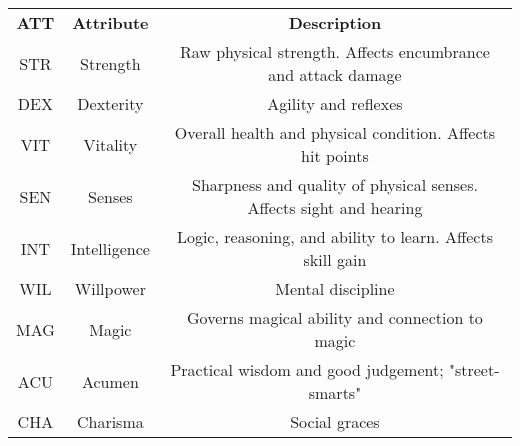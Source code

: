 
\begin{table}[h!]
    \begin{tabular}{c c c}
        \bfseries{ATT} & \bfseries{Attribute} & \bfseries{Description} \\
        STR & Strength & Raw physical strength. Affects encumbrance and attack damage \\
        DEX & Dexterity & Agility and reflexes \\
        VIT & Vitality & Overall health and physical condition. Affects hit points \\
        SEN & Senses & Sharpness and quality of physical senses. Affects sight and hearing \\
        INT & Intelligence & Logic, reasoning, and ability to learn. Affects skill gain \\
        WIL & Willpower & Mental discipline \\
        MAG & Magic & Governs magical ability and connection to magic \\
        ACU & Acumen & Practical wisdom and good judgement; "street-smarts" \\
        CHA & Charisma & Social graces \\
    \end{tabular}
    \label{tab:attributes}
\end{table}
